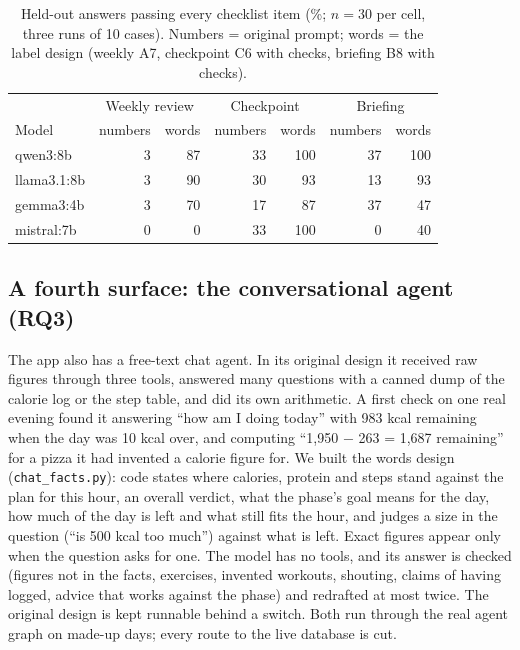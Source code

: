 \documentclass[10pt,twocolumn]{article}
\begin{document}
\begin{table}[t]
\centering\small
\caption{Held-out answers passing every checklist item (\%; $n=30$ per cell, three runs of 10 cases). Numbers = original
prompt; words = the label design (weekly A7, checkpoint C6 with checks, briefing B8 with checks).}
\label{tab:models}
\begin{tabular}{lrrrrrr}
\toprule
 & \multicolumn{2}{c}{Weekly review} & \multicolumn{2}{c}{Checkpoint} & \multicolumn{2}{c}{Briefing}\\
Model & numbers & words & numbers & words & numbers & words\\
\midrule
qwen3:8b & 3 & 87 & 33 & 100 & 37 & 100\\
llama3.1:8b & 3 & 90 & 30 & 93 & 13 & 93\\
gemma3:4b & 3 & 70 & 17 & 87 & 37 & 47\\
mistral:7b & 0 & 0 & 33 & 100 & 0 & 40\\
\bottomrule
\end{tabular}
\end{table}

\subsection{A fourth surface: the conversational agent (RQ3)}
\label{sec:res-chat}

The app also has a free-text chat agent. In its original design it received raw figures through three tools, answered many
questions with a canned dump of the calorie log or the step table, and did its own arithmetic. A first check on one real
evening found it answering ``how am I doing today'' with 983 kcal remaining when the day was 10 kcal over, and computing
``1,950 $-$ 263 = 1,687 remaining'' for a pizza it had invented a calorie figure for. We built the words design
(\texttt{chat\_facts.py}): code states where calories, protein and steps stand against the plan for this hour, an overall
verdict, what the phase's goal means for the day, how much of the day is left and what still fits the hour, and judges a
size in the question (``is 500 kcal too much'') against what is left. Exact figures appear only when the question asks for
one. The model has no tools, and its answer is checked (figures not in the facts, exercises, invented workouts, shouting,
claims of having logged, advice that works against the phase) and redrafted at most twice. The original design is kept
runnable behind a switch. Both run through the real agent graph on made-up days; every route to the live database is cut.
\end{document}
